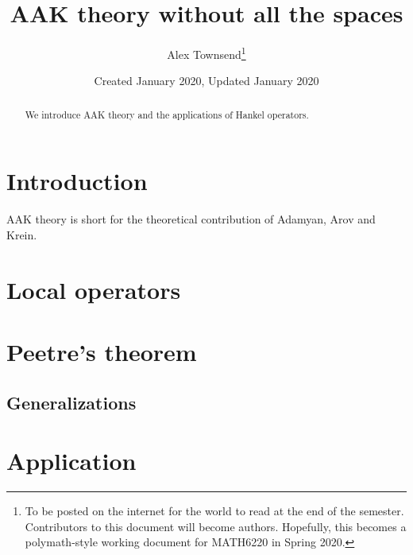 \documentclass{article}
\title{AAK theory without all the spaces}
\author{Alex Townsend\footnote{To be posted on the internet for the world to read at the end of the semester. Contributors to this document will become authors. Hopefully, this becomes a polymath-style working document for MATH6220 in Spring 2020.}}
\date{Created January 2020, Updated January 2020}
\begin{document}
\maketitle
\begin{abstract} 
We introduce AAK theory and the applications of Hankel operators.
\end{abstract}

\tableofcontents

\section{Introduction} %
AAK theory is short for the theoretical contribution of Adamyan, Arov and Krein. 
\section{Local operators} %

\section{Peetre's theorem} 

\subsection{Generalizations}

\section{Application} 
\end{document}
